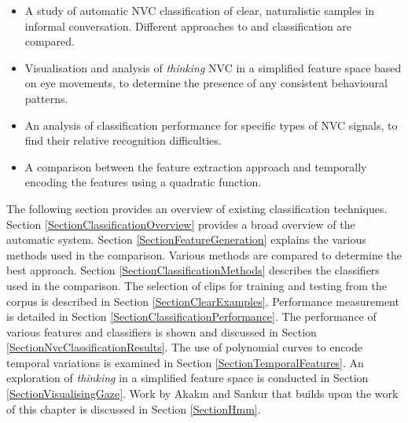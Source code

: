 \begin{itemize}
\item A study of automatic \ac{NVC} classification of clear, naturalistic samples in informal conversation. Different approaches to \featureGeneration and classification are compared.
\item Visualisation and analysis of \textit{thinking} \ac{NVC} in a simplified feature space based on eye movements, to determine the presence of any consistent behavioural patterns.
\item An analysis of classification performance for specific types of \ac{NVC} signals, to find their relative recognition difficulties.%
\item A comparison between the feature extraction approach and temporally encoding the features using a quadratic function. %
\end{itemize}

The following section provides an overview of existing classification techniques. Section \ref{SectionClassificationOverview} provides a broad overview of the automatic system. Section \ref{SectionFeatureGeneration} explains the various \featureGeneration methods used in the comparison. Various \featureGeneration methods are compared to determine the best approach. Section \ref{SectionClassificationMethods} describes the classifiers used in the comparison. The selection of clips for training and testing from the corpus is described in Section \ref{SectionClearExamples}. Performance measurement is detailed in Section \ref{SectionClassificationPerformance}. The performance of various features and classifiers is shown and discussed in Section \ref{SectionNvcClassificationResults}. The use of polynomial curves to encode temporal variations is examined in Section \ref{SectionTemporalFeatures}. An exploration of \textit{thinking} in a simplified feature space is conducted in Section \ref{SectionVisualisingGaze}. Work by Akak{\i}n and Sankur \cite{Akakin2011} that builds upon the work of this chapter is discussed in Section \ref{SectionHmm}.

